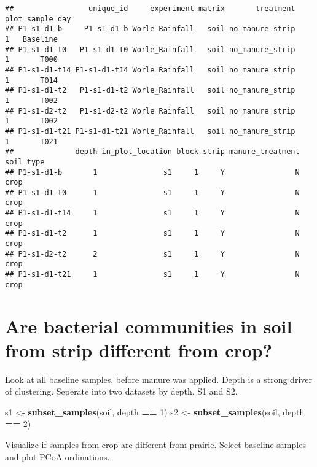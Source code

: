 \documentclass[
]{article}
\newenvironment{Shaded}{\begin{snugshade}}{\end{snugshade}}
\newcommand{\DecValTok}[1]{\textcolor[rgb]{0.00,0.00,0.81}{#1}}
\newcommand{\KeywordTok}[1]{\textcolor[rgb]{0.13,0.29,0.53}{\textbf{#1}}}
\newcommand{\NormalTok}[1]{#1}
\newcommand{\OperatorTok}[1]{\textcolor[rgb]{0.81,0.36,0.00}{\textbf{#1}}}
\newcommand{\StringTok}[1]{\textcolor[rgb]{0.31,0.60,0.02}{#1}}
\begin{document}
\begin{verbatim}
##                 unique_id     experiment matrix       treatment plot sample_day
## P1-s1-d1-b     P1-s1-d1-b Worle_Rainfall   soil no_manure_strip    1   Baseline
## P1-s1-d1-t0   P1-s1-d1-t0 Worle_Rainfall   soil no_manure_strip    1       T000
## P1-s1-d1-t14 P1-s1-d1-t14 Worle_Rainfall   soil no_manure_strip    1       T014
## P1-s1-d1-t2   P1-s1-d1-t2 Worle_Rainfall   soil no_manure_strip    1       T002
## P1-s1-d2-t2   P1-s1-d2-t2 Worle_Rainfall   soil no_manure_strip    1       T002
## P1-s1-d1-t21 P1-s1-d1-t21 Worle_Rainfall   soil no_manure_strip    1       T021
##              depth in_plot_location block strip manure_treatment soil_type
## P1-s1-d1-b       1               s1     1     Y                N      crop
## P1-s1-d1-t0      1               s1     1     Y                N      crop
## P1-s1-d1-t14     1               s1     1     Y                N      crop
## P1-s1-d1-t2      1               s1     1     Y                N      crop
## P1-s1-d2-t2      2               s1     1     Y                N      crop
## P1-s1-d1-t21     1               s1     1     Y                N      crop
\end{verbatim}

\hypertarget{are-bacterial-communities-in-soil-from-strip-different-from-crop}{%
\section{Are bacterial communities in soil from strip different from
crop?}\label{are-bacterial-communities-in-soil-from-strip-different-from-crop}}

Look at all baseline samples, before manure was applied. Depth is a
strong driver of clustering. Seperate into two datasets by depth, S1 and
S2.

\begin{Shaded}
\begin{Highlighting}[]
\NormalTok{s1 <-}\StringTok{ }\KeywordTok{subset_samples}\NormalTok{(soil, depth }\OperatorTok{==}\StringTok{ }\DecValTok{1}\NormalTok{)}
\NormalTok{s2 <-}\StringTok{ }\KeywordTok{subset_samples}\NormalTok{(soil, depth }\OperatorTok{==}\StringTok{ }\DecValTok{2}\NormalTok{)}
\end{Highlighting}
\end{Shaded}

Visualize if samples from crop are different from prairie. Select
baseline samples and plot PCoA ordinations.
\end{document}
